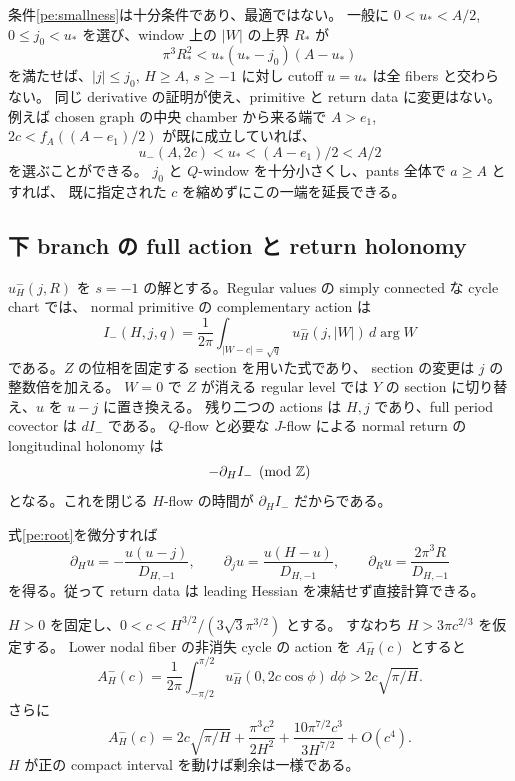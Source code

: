 \begin{remark}
\label{pe:barrier}
条件\eqref{pe:smallness}は十分条件であり、最適ではない。
一般に $0<u_*<A/2$, $0\le j_0<u_*$ を選び、window 上の $|W|$ の上界 $R_*$ が
\[
 \pi^3R_*^2<u_*(u_*-j_0)(A-u_*)
\]
を満たせば、$|j|\le j_0$, $H\ge A$, $s\ge-1$ に対し cutoff $u=u_*$ は全 fibers と交わらない。
同じ derivative の証明が使え、primitive と return data に変更はない。
例えば chosen graph の中央 chamber から来る端で
$A>e_1$, $2c<f_A((A-e_1)/2)$ が既に成立していれば、
\[
 u_-(A,2c)<u_*<(A-e_1)/2<A/2
\]
を選ぶことができる。
$j_0$ と $Q$-window を十分小さくし、pants 全体で $a\ge A$ とすれば、
既に指定された $c$ を縮めずにこの一端を延長できる。
\end{remark}

\subsection{下 branch の full action と return holonomy}

$u_H^-(j,R)$ を $s=-1$ の解とする。Regular values の simply connected な cycle chart では、
normal primitive の complementary action は
\begin{equation}\label{pe:action}
 I_-(H,j,q)=\frac1{2\pi}
 \int_{|W-c|=\sqrt q}u_H^-(j,|W|)\,d\arg W
\end{equation}
である。$Z$ の位相を固定する section を用いた式であり、
section の変更は $j$ の整数倍を加える。
$W=0$ で $Z$ が消える regular level では $Y$ の section に切り替え、$u$ を $u-j$ に置き換える。
残り二つの actions は $H,j$ であり、full period covector は $dI_-$ である。
$Q$-flow と必要な $J$-flow による normal return の longitudinal holonomy は
\begin{equation}\label{pe:return}
 -\partial_H I_-\pmod{\mathbb Z}
\end{equation}
となる。これを閉じる $H$-flow の時間が $\partial_H I_-$ だからである。

式\eqref{pe:root}を微分すれば
\begin{equation}\label{pe:derivatives}
 \partial_Hu=-\frac{u(u-j)}{D_{H,-1}},\qquad
 \partial_ju=\frac{u(H-u)}{D_{H,-1}},\qquad
 \partial_Ru=\frac{2\pi^3R}{D_{H,-1}}
\end{equation}
を得る。従って return data は leading Hessian を凍結せず直接計算できる。

\begin{proposition}\label{pe:nodal}
$H>0$ を固定し、$0<c<H^{3/2}/(3\sqrt3\pi^{3/2})$ とする。
すなわち $H>3\pi c^{2/3}$ を仮定する。
Lower nodal fiber の非消失 cycle の action を $A_H^-(c)$ とすると
\begin{equation}\label{pe:nodal-integral}
 A_H^-(c)=\frac1{2\pi}\int_{-\pi/2}^{\pi/2}
 u_H^-(0,2c\cos\phi)\,d\phi
 >2c\sqrt{\pi/H}.
\end{equation}
さらに
\begin{equation}\label{pe:nodal-expansion}
 A_H^-(c)=2c\sqrt{\pi/H}
 +\frac{\pi^3c^2}{2H^2}
 +\frac{10\pi^{7/2}c^3}{3H^{7/2}}+O(c^4).
\end{equation}
$H$ が正の compact interval を動けば剰余は一様である。
\end{proposition}

